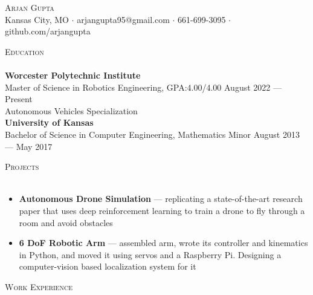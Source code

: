 \documentclass[a4paper]{article}
\newcommand{\lineunder} {
    \vspace*{-8pt} \\
    \hspace*{-18pt} \hrulefill \\
}
\newcommand{\header} [1] {
    {\hspace*{-18pt}\vspace*{6pt} \textsc{#1}}
    \vspace*{-6pt} \lineunder
}
\begin{document}
\vspace*{-40pt}

    

\vspace*{-10pt}
\begin{center}
	{\Huge \scshape {Arjan Gupta}}\\
	Kansas City, MO $\cdot$ arjangupta95@gmail.com $\cdot$ 661-699-3095 $\cdot$ github.com/arjangupta\\
\end{center}


\header{Education}
\textbf{Worcester Polytechnic Institute}\\
Master of Science in Robotics Engineering, GPA:\@ 4.00/4.00 \hfill August 2022 --- Present\\
Autonomous Vehicles Specialization\\
\vspace{2mm}
\textbf{University of Kansas}\\
Bachelor of Science in Computer Engineering, Mathematics Minor \hfill August 2013 --- May 2017\\

\vspace{5mm}

\header{Projects}
\vspace{-1mm}
\begin{itemize} \itemsep 1pt
    \item \textbf{Autonomous Drone Simulation} --- replicating a state-of-the-art research paper that uses deep reinforcement
    learning to train a drone to fly through a room and avoid obstacles
    \item \textbf{6 DoF Robotic Arm} --- assembled arm, wrote its controller and kinematics in Python, and moved it using servos and a Raspberry Pi. Designing a computer-vision based localization system for it
\end{itemize}

\header{Work Experience}
\vspace{1mm}
\end{document}
